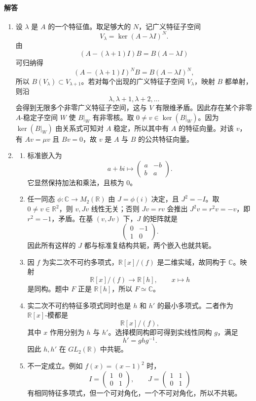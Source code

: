 \documentclass[UTF8,12pt]{ctexart}
\begin{document}
\paragraph{解答}
\begin{enumerate}[label=\textbf{\arabic*.},leftmargin=2.2em]
\item 设 \(\lambda\) 是 \(A\) 的一个特征值。取足够大的 \(N\)，记广义特征子空间
\[
V_\lambda=\ker(A-\lambda I)^N.
\]
由
\[
(A-(\lambda+1)I)B=B(A-\lambda I)
\]
可归纳得
\[
(A-(\lambda+1)I)^N B=B(A-\lambda I)^N,
\]
所以 \(B(V_\lambda)\subset V_{\lambda+1}\)。若对每个出现的广义特征子空间 \(V_\lambda\)，映射 \(B\) 都单射，则沿
\[
\lambda,\lambda+1,\lambda+2,\ldots
\]
会得到无限多个非零广义特征子空间，这与 \(V\) 有限维矛盾。因此存在某个非零 \(A\)-稳定子空间 \(W\) 使 \(B|_W\) 有非零核。取 \(0\ne v\in\ker(B|_W)\)。因为 \(\ker(B|_W)\) 由关系式可知对 \(A\) 稳定，所以其中有 \(A\) 的特征向量。对该 \(v\)，有 \(Av=\mu v\) 且 \(Bv=0\)，故 \(v\) 是 \(A\) 与 \(B\) 的公共特征向量。

\item
\begin{enumerate}[label=\textbf{(\alph*)},leftmargin=2.4em]
\item 标准嵌入为
\[
a+bi\longmapsto
\begin{pmatrix}
a&-b\\
b&a
\end{pmatrix}.
\]
它显然保持加法和乘法，且核为 \(0\)。
\item 任一同态 \(\phi:\mathbb C\to M_2(\mathbb R)\) 由 \(J=\phi(i)\) 决定，且 \(J^2=-I\)。取 \(0\ne v\in\mathbb R^2\)，则 \(v,Jv\) 线性无关；否则 \(Jv=rv\) 会推出 \(J^2v=r^2v=-v\)，即 \(r^2=-1\)，矛盾。在基 \((v,Jv)\) 下，\(J\) 的矩阵就是
\[
\begin{pmatrix}0&-1\\1&0\end{pmatrix}.
\]
因此所有这样的 \(J\) 都与标准复结构共轭，两个嵌入也就共轭。
\item 因 \(f\) 为实二次不可约多项式，\(\mathbb R[x]/(f)\) 是二维实域，故同构于 \(\mathbb C\)。映射
\[
\mathbb R[x]/(f)\longrightarrow \mathbb R[h],\qquad x\mapsto h
\]
是同构。题中 \(F\) 正是 \(\mathbb R[h]\)，所以 \(F\simeq\mathbb C\)。
\item 实二次不可约特征多项式同时也是 \(h\) 和 \(h'\) 的最小多项式。二者作为 \(\mathbb R[x]\)-模都是
\[
\mathbb R[x]/(f),
\]
其中 \(x\) 作用分别为 \(h\) 与 \(h'\)。选择模同构即可得到实线性同构 \(g\)，满足
\[
h'=ghg^{-1}.
\]
因此 \(h,h'\) 在 \(GL_2(\mathbb R)\) 中共轭。
\item 不一定成立。例如 \(f(x)=(x-1)^2\) 时，
\[
I=\begin{pmatrix}1&0\\0&1\end{pmatrix},
\qquad
J=\begin{pmatrix}1&1\\0&1\end{pmatrix}
\]
有相同特征多项式，但一个可对角化，一个不可对角化，所以不共轭。
\end{enumerate}


\end{enumerate}
\end{document}
